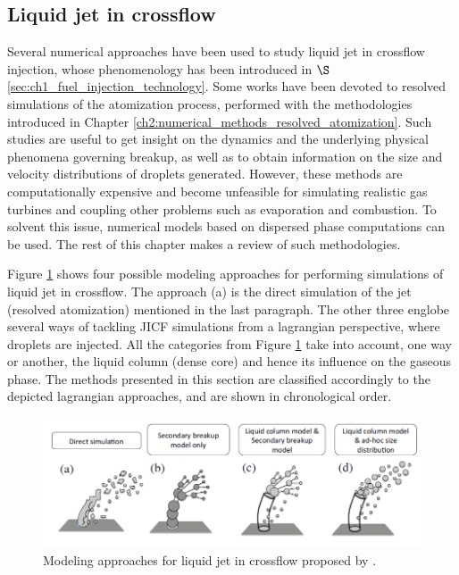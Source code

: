 \subsection{Liquid jet in crossflow}
\label{ch3:subsec_lagrangian_liquid_JICF}

Several numerical approaches have been used to study liquid jet in crossflow injection, whose phenomenology has been introduced in $\S$\ref{sec:ch1_fuel_injection_technology}. Some works  have been devoted to resolved simulations of the atomization process, performed with the methodologies introduced in Chapter \ref{ch2:numerical_methods_resolved_atomization}. Such studies are useful to get insight on the dynamics and the underlying physical phenomena governing breakup, as well as to obtain information on the size and velocity distributions of droplets generated. However, these methods are computationally expensive and become unfeasible for simulating realistic gas turbines and coupling other problems such as evaporation and combustion. To solvent this issue, numerical models based on dispersed phase computations can be used. The rest of this chapter makes a review of such methodologies.

Figure \ref{fig:jaegle_jicf_modeling_approaches} shows four possible modeling approaches for performing simulations of liquid jet in crossflow. The approach (a) is the direct simulation of the jet (resolved atomization) mentioned in the last paragraph. The other three englobe several ways of tackling JICF simulations from a lagrangian perspective, where droplets are injected. All the categories from Figure \ref{fig:jaegle_jicf_modeling_approaches} take into account, one way or another, the liquid column (dense core) and hence its influence on the gaseous phase. The methods presented in this section are classified accordingly to the depicted lagrangian approaches, and are shown in chronological order.

\begin{figure}[ht]
    \centering
    \includegraphics[width=1.0\textwidth]{./part1_numerical_approaches/figures_ch3/modelling_approaches_JICF_Jaegle}
       \centering
    \caption{Modeling approaches for liquid jet in crossflow proposed by .}
    \label{fig:jaegle_jicf_modeling_approaches}
\end{figure}

